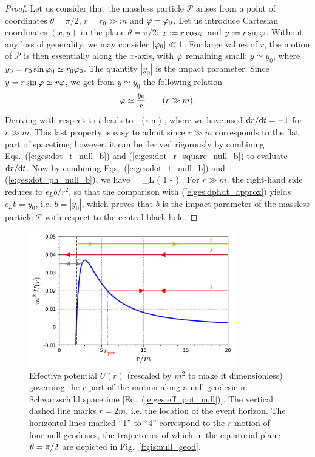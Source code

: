 \begin{proof}
Let us consider that the massless
particle $\mathscr{P}$ arises from a point of coordinates $\theta=\pi/2$,
$r=r_0 \gg m$ and $\varphi = \varphi_0$.  Let us introduce
Cartesian coordinates $(x,y)$ in the plane $\theta=\pi/2$:
$x:=r\cos\varphi$ and $y:=r\sin\varphi$.
Without any loss of generality, we may
consider $|\varphi_0| \ll 1$. For large values of $r$, the motion of
$\mathscr{P}$ is then essentially along the $x$-axis, with $\varphi$ remaining small:
$y\simeq y_0$, where
$y_0 = r_0 \sin\varphi_0 \simeq r_0 \varphi_0$. The quantity
$|y_0|$ is the impact parameter.
Since $y=r\sin\varphi\simeq r\varphi$, we get from $y\simeq y_0$
the following relation
\[
    \varphi \simeq \frac{y_0}{r} \qquad (r \gg m) .
\]
Deriving with respect to $t$ leads to
\be \label{e:ges:dphdt_approx}
     \simeq -  
                  \simeq {}  \qquad (r \gg m) ,
\ee
where we have used $\mathrm{d} r / \mathrm{d} t = - 1$ for $r \gg m$. This last property is easy
to admit since
$r\gg m$ corresponds to the flat part of spacetime; however, it can be derived
rigorously by combining Eqs.~(\ref{e:ges:dot_t_null_b}) and
(\ref{e:ges:dot_r_square_null_b}) to evaluate $\mathrm{d} r / \mathrm{d} t$.
Now by combining Eqs.~(\ref{e:ges:dot_t_null_b}) and (\ref{e:ges:dot_ph_null_b}),
we have
\be
     = \epsilon_L  \left( 1 -  \right) .
\ee
For $r\gg m$, the right-hand side reduces to $\epsilon_L b/r^2$, so that the comparison
with (\ref{e:ges:dphdt_approx}) yields $\epsilon_L b = y_0$, i.e. $b = |y_0|$,
which proves that $b$ is the impact
parameter of the massless particle $\mathscr{P}$ with respect to the central
black hole.
\end{proof}

\begin{figure}
\centerline{\includegraphics[width=0.8\textwidth]{ges_eff_pot_null.pdf}}
\caption[]{\label{f:gis:eff_pot_null} \footnotesize
Effective potential $U(r)$ (rescaled by $m^2$ to make it dimensionless)
governing the $r$-part of the
motion along a null geodesic in
Schwarzschild spacetime [Eq.~(\ref{e:ges:eff_pot_null})].
The vertical dashed line marks $r=2m$, i.e. the
location of the event horizon. The horizontal lines marked ``1'' to ``4''
correspond to the $r$-motion of four null geodesics,
the trajectories of which in the equatorial plane $\theta=\pi/2$
are depicted in Fig.~\ref{f:gis:null_geod}.}
\end{figure}

